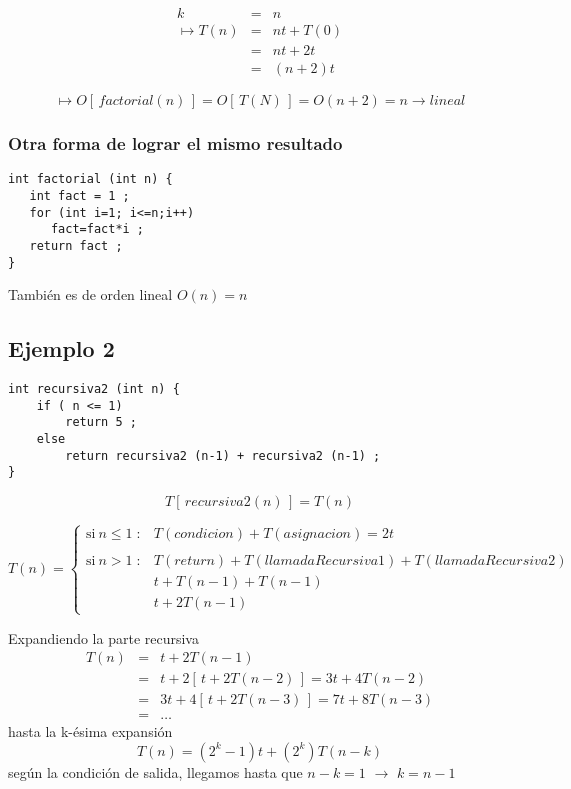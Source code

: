 \begin{eqnarray*}
  k &=& n  \\
  \mapsto T(n) &=& nt + T(0)\\
  &=& nt + 2t\\
  &=& (n+2)t
\end{eqnarray*}

$$\mapsto O[\, factorial (n) \,] = O[\, T(N)\, ] = O(n+2) = n \rightarrow lineal$$    

\subsubsection{Otra forma de lograr el mismo resultado}
\label{sec:otra-forma-de}

\begin{verbatim}
int factorial (int n) {
   int fact = 1 ;
   for (int i=1; i<=n;i++)
      fact=fact*i ;
   return fact ;
}
\end{verbatim}

También es de orden lineal $O(n) = n$

\subsection{Ejemplo 2}
\label{sec:ejemplo-2}

\begin{verbatim}
int recursiva2 (int n) {
    if ( n <= 1)
        return 5 ;
    else
        return recursiva2 (n-1) + recursiva2 (n-1) ;
}
\end{verbatim}

$$T [\, recursiva2 (n) \,] = T (n)$$

\begin{equation*}
  T(n) = \left\{
    \begin{array}{ll}
      \mathrm{si\ } n \le 1 \; :    &  T(condicion)+T(asignacion)=2t\\
      \\
      \mathrm{si\ } n > 1 \; : &  T(return)+T(llamadaRecursiva1)+T(llamadaRecursiva2)\\
      & t+T(n-1)+T(n-1)\\
      & t+2T(n-1)
    \end{array}
  \right.
\end{equation*}

Expandiendo la parte recursiva
\begin{eqnarray*}
  T(n) &=& t + 2 T(n-1)\\
    &=& t + 2 [\, t + 2 T(n-2) \,] = 3t + 4 T (n-2)\\
    &=& 3t + 4 [\, t + 2T(n-3) \,] =  7t + 8 T (n-3)\\
     &=& \ldots
\end{eqnarray*}
hasta la k-ésima expansión
  $$T(n) = (2^k -1)t + ( 2^k ) T (n-k)$$
  según la condición de salida, llegamos hasta que $n-k=1$ $\rightarrow$ $k = n -1$

